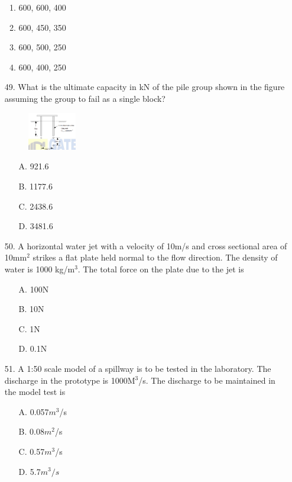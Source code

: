 \documentclass[journal]{IEEEtran}
\begin{document}
\begin{enumerate}
  \begin{enumerate}[label=\Alph*]
      \item 600, 600, 400
      \item 600, 450, 350
      \item 600, 500, 250
      \item 600, 400, 250
  \end{enumerate}
  \item [49.] What is the ultimate capacity in kN of the pile group shown in the figure
  assuming the group to fail as a single block? 
  \begin{figure}[h!]
    \centering
    \includegraphics[width=0.2\textwidth]{figs/Fig_7.png}  %
    \label{fig:sample7}
\end{figure}
  \begin{enumerate}
    \item [A.] 921.6
    \item [B.] 1177.6
    \item [C.] 2438.6
    \item [D.] 3481.6
  \end{enumerate}
  \item [50.] A horizontal water jet with a velocity of 10m/s and cross sectional area of 10mm$^2$
  strikes a flat plate held normal to the flow direction. The density of water is 1000
  kg/m$^3$. The total force on the plate due to the jet is 
  \begin{enumerate}
    \item [A.] 100N
    \item [B.] 10N 
    \item [C.] 1N 
    \item [D.] 0.1N 
  \end{enumerate}
  \item [51.] A 1:50 scale model of a spillway is to be tested in the laboratory. The discharge in
  the prototype is 1000M$^3$/s. The discharge to be maintained in the model test is 
  \begin{enumerate}
    \item [A.] 0.057$m^3$/s 
    \item [B.] 0.08$m^2$/s 
    \item [C.] 0.57$m^3$/s 
    \item [D.] 5.7$m^3/s$
  \end{enumerate}
\end{enumerate}
\end{document}
